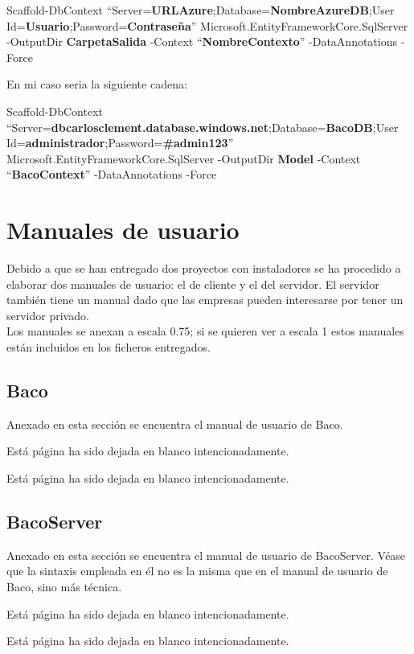\documentclass[12pt, a4paper]{book} %
\makeatletter
\newcommand*{\blankpage}{%
	\vspace*{\fill}
	{\centering Está página ha sido dejada en blanco intencionadamente.\par}
	\vspace{\fill}}
\renewcommand*{\cleardoublepage}{\clearpage\if@twoside \ifodd\c@page\else
	\blankpage
	\thispagestyle{fancy}
	\newpage
	\if@twocolumn\hbox{}\newpage\fi\fi\fi}
\makeatother
\begin{document}
			\begin{center}
				\textsf{Scaffold-DbContext ``Server=\textbf{URLAzure};Database=\textbf{NombreAzureDB};User Id=\textbf{Usuario};Password=\textbf{Contraseña}'' Microsoft.EntityFrameworkCore.SqlServer -OutputDir \textbf{CarpetaSalida} -Context ``\textbf{NombreContexto}'' -DataAnnotations -Force}
			\end{center}
			En mi caso seria la siguiente cadena:
			\begin{center}
				\textsf{Scaffold-DbContext ``Server=\textbf{dbcarlosclement.database.windows.net};Database=\textbf{BacoDB};User Id=\textbf{administrador};Password=\textbf{\#admin123}'' Microsoft.EntityFrameworkCore.SqlServer -OutputDir \textbf{Model} -Context ``\textbf{BacoContext}'' -DataAnnotations -Force}
			\end{center}
	\chapter{Manuales de usuario} \label{ch:man}
	Debido a que se han entregado dos proyectos con instaladores se ha procedido a elaborar dos manuales de usuario: el de cliente y el del servidor. El servidor también tiene un manual dado que las empresas pueden interesarse por tener un servidor privado.\\
	Los manuales se anexan a escala 0.75; si se quieren ver a escala 1 estos manuales están incluidos en los ficheros entregados. 
		\section{Baco}
		Anexado en esta sección se encuentra el manual de usuario de Baco.
		\cleardoublepage
		
		\cleardoublepage
		\section{BacoServer}
		Anexado en esta sección se encuentra el manual de usuario de BacoServer. Véase que la sintaxis empleada en él no es la misma que en el manual de usuario de Baco, sino más técnica.
		\cleardoublepage
		
		\cleardoublepage
\end{document}
